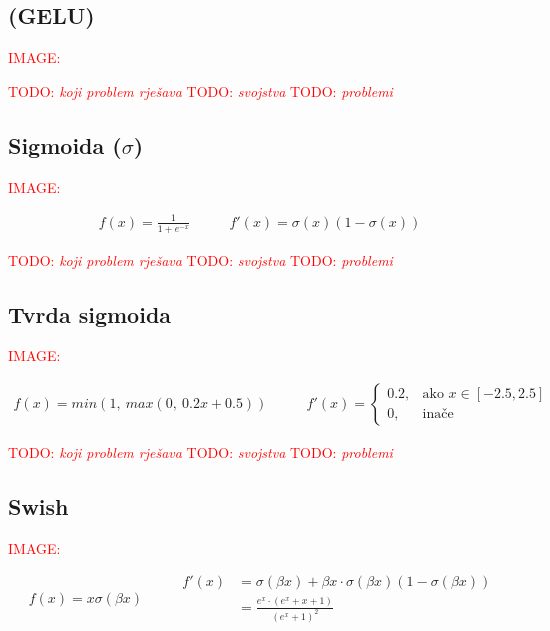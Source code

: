 \documentclass[times, utf8, diplomski]{fer}
\def\TODO#1{\noindent\textcolor{red}{TODO: \textit{#1}}\newline}
\def\todo#1{\TODO{#1}}
\def\todoimg#1{\begin{center} \textcolor{red}{IMAGE: \textit{#1}} \end{center}}
\begin{document}
\subsection*{(GELU)}

\todoimg{}

\todo{koji problem rješava}
\todo{svojstva}
\todo{problemi}

\subsection*{Sigmoida ($\sigma $)}

\todoimg{}

\begin{equation}
\begin{split}
f(x) = \frac{1}{1+e^{-x}}
\end{split}
\qquad
\begin{split}
f'(x) = \sigma(x)(1-\sigma(x))
\end{split}
\end{equation}

\todo{koji problem rješava}
\todo{svojstva}
\todo{problemi}

\subsection*{Tvrda sigmoida}

\todoimg{}

\begin{equation}
\begin{split}
f(x) = min(1,\ max(0,\ 0.2x + 0.5))
\end{split}
\qquad
\begin{split}
f'(x) = 
\begin{cases}
0.2,	 		& \text{ako } x \in [-2.5, 2.5] \\
0,	& \text{inače}
\end{cases}
\end{split}
\end{equation}

\todo{koji problem rješava}
\todo{svojstva}
\todo{problemi}

\subsection*{Swish}

\todoimg{}

\begin{equation}
\begin{split}
f(x) = x \sigma(\beta x)
\end{split}
\qquad
\begin{split}
f'(x) &= \sigma(\beta x) + \beta x \cdot \sigma(\beta x)(1-\sigma(\beta x)) \\
&= \frac{e^x \cdot (e^x + x + 1)}{(e^x + 1)^2}
\end{split}
\end{equation}
\end{document}
